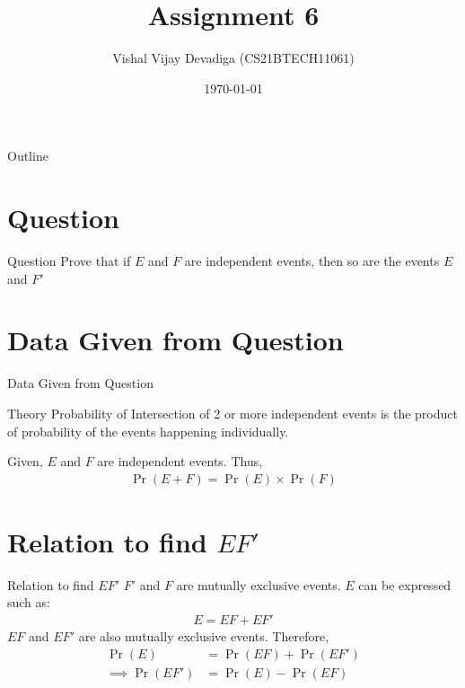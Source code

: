 \documentclass{beamer}
\title{Assignment 6}
\author{Vishal Vijay Devadiga (CS21BTECH11061)}
\date{\today}
\providecommand{\pr}[1]{\ensuremath{\Pr\left(#1\right)}}
\begin{document}
\begin{frame}
    \titlepage
\end{frame}

\logo{}

\begin{frame}{Outline}
    \tableofcontents
\end{frame}

\section{Question}
\begin{frame}{Question}
    Prove that if $E$ and $F$ are independent events, then so are the events $E$ and $F'$
\end{frame}

\section{Data Given from Question}
\begin{frame}{Data Given from Question}
    \begin{block}{Theory}
        Probability of Intersection of 2 or more independent events is the product of probability of the events happening individually.
    \end{block}
    Given, $E$ and $F$ are independent events. Thus,
    \begin{align}
        \label{eq:1}
        \pr{E + F} = \pr{E} \times \pr{F}
    \end{align}
\end{frame}

\section{Relation to find $EF'$}
\begin{frame}{Relation to find $EF'$}
    $F'$ and $F$ are mutually exclusive events. $E$ can be expressed such as:
    \begin{align}
        E = EF + EF'
    \end{align}
    $EF$ and $EF'$ are also mutually exclusive events. Therefore,
    \begin{align}
        \pr{E}            & = \pr{EF} + \pr{EF'}
        \\
        \label{eq:2}
        \implies \pr{EF'} & = \pr{E} - \pr{EF}
    \end{align}
\end{frame}
\end{document}
